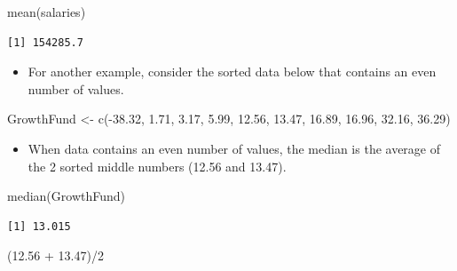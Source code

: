 \documentclass[
  letterpaper,
  DIV=11,
  numbers=noendperiod]{scrreprt}
\newenvironment{Shaded}{\begin{snugshade}}{\end{snugshade}}
\newcommand{\DecValTok}[1]{\textcolor[rgb]{0.68,0.00,0.00}{#1}}
\newcommand{\FloatTok}[1]{\textcolor[rgb]{0.68,0.00,0.00}{#1}}
\newcommand{\FunctionTok}[1]{\textcolor[rgb]{0.28,0.35,0.67}{#1}}
\newcommand{\NormalTok}[1]{\textcolor[rgb]{0.00,0.23,0.31}{#1}}
\newcommand{\OtherTok}[1]{\textcolor[rgb]{0.00,0.23,0.31}{#1}}
\newcommand{\SpecialCharTok}[1]{\textcolor[rgb]{0.37,0.37,0.37}{#1}}
\providecommand{\tightlist}{%
  \setlength{\itemsep}{0pt}\setlength{\parskip}{0pt}}\usepackage{longtable,booktabs,array}
\begin{document}
\begin{Shaded}
\begin{Highlighting}[]
\FunctionTok{mean}\NormalTok{(salaries)}
\end{Highlighting}
\end{Shaded}

\begin{verbatim}
[1] 154285.7
\end{verbatim}

\begin{itemize}
\tightlist
\item
  For another example, consider the sorted data below that contains an
  even number of values.
\end{itemize}

\begin{Shaded}
\begin{Highlighting}[]
\NormalTok{GrowthFund }\OtherTok{\textless{}{-}} \FunctionTok{c}\NormalTok{(}\SpecialCharTok{{-}}\FloatTok{38.32}\NormalTok{, }\FloatTok{1.71}\NormalTok{, }\FloatTok{3.17}\NormalTok{, }\FloatTok{5.99}\NormalTok{, }\FloatTok{12.56}\NormalTok{, }\FloatTok{13.47}\NormalTok{, }\FloatTok{16.89}\NormalTok{, }\FloatTok{16.96}\NormalTok{, }\FloatTok{32.16}\NormalTok{,}
    \FloatTok{36.29}\NormalTok{)}
\end{Highlighting}
\end{Shaded}

\begin{itemize}
\tightlist
\item
  When data contains an even number of values, the median is the average
  of the 2 sorted middle numbers (12.56 and 13.47).
\end{itemize}

\begin{Shaded}
\begin{Highlighting}[]
\FunctionTok{median}\NormalTok{(GrowthFund)}
\end{Highlighting}
\end{Shaded}

\begin{verbatim}
[1] 13.015
\end{verbatim}

\begin{Shaded}
\begin{Highlighting}[]
\NormalTok{(}\FloatTok{12.56} \SpecialCharTok{+} \FloatTok{13.47}\NormalTok{)}\SpecialCharTok{/}\DecValTok{2}
\end{Highlighting}
\end{Shaded}
\end{document}
